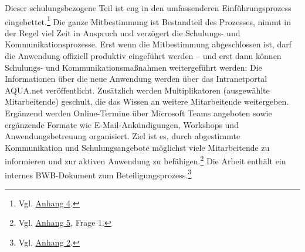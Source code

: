 \documentclass[
    12pt, 
    a4paper,
    ]{scrartcl} %
\begin{document}
Dieser schulungsbezogene Teil ist eng in den umfassenderen Einführungsprozess eingebettet.\footnote{Vgl. \hyperref[sec:Anhang4]{Anhang 4}.} Die ganze Mitbestimmung ist Bestandteil des Prozesses, nimmt in der Regel viel Zeit in Anspruch und verzögert die Schulungs- und Kommunikationsprozesse. Erst wenn die Mitbestimmung abgeschlossen ist, darf die Anwendung offiziell produktiv eingeführt werden – und erst dann können Schulungs- und Kommunikationsmaßnahmen weitergeführt werden: Die Informationen über die neue Anwendung werden über das Intranetportal AQUA.net veröffentlicht. Zusätzlich werden Multiplikatoren (ausgewählte Mitarbeitende) geschult, die das Wissen an weitere Mitarbeitende weitergeben. Ergänzend werden Online-Termine über Microsoft Teams angeboten sowie ergänzende Formate wie E-Mail-Ankündigungen, Workshops und Anwendungsbetreuung organisiert. Ziel ist es, durch abgestimmte Kommunikation und Schulungsangebote möglichst viele Mitarbeitende zu informieren und zur aktiven Anwendung zu befähigen.\footnote{Vgl. \hyperref[sec:Anhang 5]{Anhang 5}, Frage 1.} Die Arbeit enthält ein internes BWB-Dokument zum Beteiligungsprozess.\footnote{Vgl. \hyperref[sec:Anhang2]{Anhang 2}.}
\end{document}
